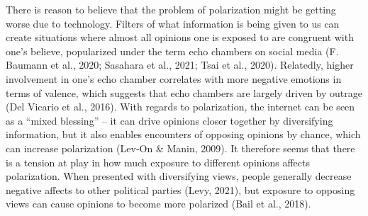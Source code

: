 \documentclass{article}
\begin{document}
There is reason to believe that the problem of polarization might be getting worse due to technology. Filters of what information is being given to us can create situations where almost all opinions one is exposed to are congruent with one’s believe, popularized under the term echo chambers on social media (F. Baumann et al., 2020; Sasahara et al., 2021; Tsai et al., 2020). Relatedly, higher involvement in one’s echo chamber correlates with more negative emotions in terms of valence, which suggests that echo chambers are largely driven by outrage (Del Vicario et al., 2016). With regards to polarization, the internet can be seen as a “mixed blessing” – it can drive opinions closer together by diversifying information, but it also enables encounters of opposing opinions by chance, which can increase polarization (Lev-On \& Manin, 2009). It therefore seems that there is a tension at play in how much exposure to different opinions affects polarization. When presented with diversifying views, people generally decrease negative affects to other political parties (Levy, 2021), but exposure to opposing views can cause opinions to become more polarized (Bail et al., 2018). 
\end{document}
